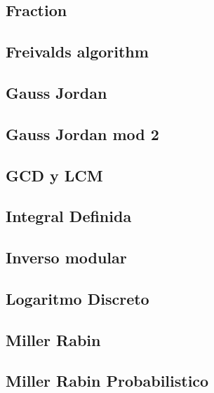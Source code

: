 \subsection{Fraction}
\raggedbottom
\hrulefill
\subsection{Freivalds algorithm}
\raggedbottom
\hrulefill
\subsection{Gauss Jordan}
\raggedbottom
\hrulefill
\subsection{Gauss Jordan mod 2}
\raggedbottom
\hrulefill
\subsection{GCD y LCM}
\raggedbottom
\hrulefill
\subsection{Integral Definida}
\raggedbottom
\hrulefill
\subsection{Inverso modular}
\raggedbottom
\hrulefill
\subsection{Logaritmo Discreto}
\raggedbottom
\hrulefill
\subsection{Miller Rabin}
\raggedbottom
\hrulefill
\subsection{Miller Rabin Probabilistico}
\raggedbottom
\hrulefill
